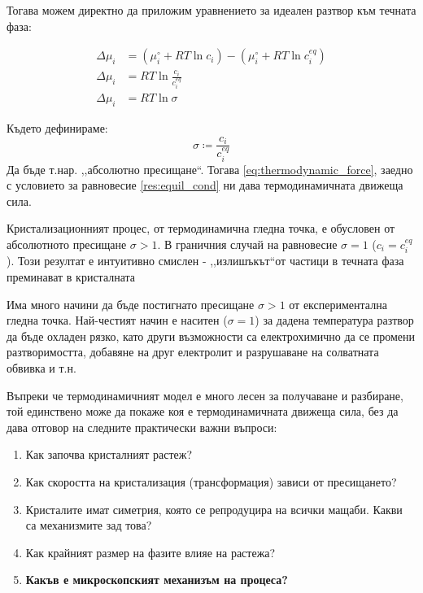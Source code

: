 \noindent Тогава можем директно да приложим уравнението за идеален разтвор към течната фаза:

\begin{align}
	\Delta \mu_{i} & = \left( \mu_{i}^\circ + RT\ln{c_i} \right) - \left( \mu_{i}^\circ + RT\ln{c_{i}^{eq}} \right) \nonumber \\
	\Delta \mu_{i} & = RT\ln{\frac{c_i}{c_{i}^{eq}}} \nonumber                                                                \\
	\Delta \mu_{i} & = RT\ln{\sigma} \label{eq:thermodynamic_force}                                                           
\end{align}

\noindent Където дефинираме:
\begin{equation}
	\label{eq:abs_supersat}
	\sigma \coloneqq \frac{c_{i}}{c_{i}^{eq}}
\end{equation}
Да бъде т.нар. ,,абсолютно пресищане``. Тогава \autoref{eq:thermodynamic_force}, заедно с условието за равновесие \autoref{res:equil_cond} ни дава термодинамичната движеща сила.

Кристализационният процес, от термодинамична гледна точка, е обусловен от абсолютното пресищане $\sigma > 1$. В граничния случай на равновесие $\sigma = 1$ ($c_{i}  = c_{i}^{eq}$). Този резултат е интуитивно смислен - ,,излишъкът``от частици в течната фаза преминават в кристалната \cite{IvanMarkovCGB}

Има много начини да бъде постигнато пресищане $\sigma > 1$ от експериментална гледна точка. Най-честият начин е наситен ($\sigma = 1$) за дадена температура разтвор да бъде охладен рязко, като други възможности са електрохимично да се промени разтворимостта, добавяне на друг електролит и разрушаване на солватната обвивка и т.н. 

Въпреки че термодинамичният модел е много лесен за получаване и разбиране, той единствено може да покаже коя е термодинамичната движеща сила, без да дава отговор на следните практически важни въпроси:
\begin{enumerate}
	\item Как започва кристалният растеж?
	\item Как скоростта на кристализация (трансформация) зависи от пресищането?
	\item Кристалите имат симетрия, която се репродуцира на всички мащаби. Какви са механизмите зад това?
	\item Как крайният размер на фазите влияе на растежа?
	\item \textbf{Какъв е микроскопският механизъм на процеса?}
\end{enumerate}

